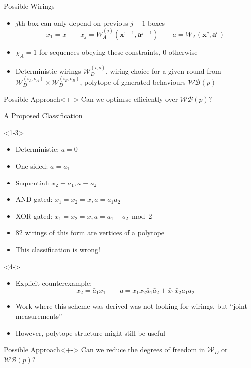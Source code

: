 \documentclass[xcolor=dvipsnames]{beamer}
\newcommand{\?}{\mathrel{?}} %
\newcommand{\cvec}[1]{\boldsymbol{\mathbf{#1}}}    %
\newcommand{\sW}{\mathcal{W}}
\newcommand{\sWB}{\mathcal{WB}}
\begin{document}
\begin{frame}{Possible Wirings}
  \begin{itemize}[<+->]
    \item \(j\)th box can only depend on previous \(j-1\) boxes
    \[ x_1 = x \qquad x_j = W^{(j)}_A(\cvec{x}^{j-1}, \cvec{a}^{j-1}) \qquad
      a = W_A(\cvec{x}^{c}, \cvec{a}^{c}) \]
    \item \(\chi_A = 1\) for sequences obeying these constraints, \(0\) otherwise
    \item Deterministic wirings \(\sW_D^{(i,o)}\), wiring choice for a given round from \(\sW_D^{(i_A,o_A)} \times \sW_D^{(i_B,o_B)}\), polytope of generated behaviours \(\sWB(p)\)
  \end{itemize}

  \begin{block}{Possible Approach}<+->
    Can we optimise efficiently over \(\sWB(p)\)?
  \end{block}
\end{frame}

\begin{frame}{A Proposed Classification}
  \begin{onlyenv}<1-3>
    \begin{itemize}
      \item Deterministic: \(a = 0\)
      \item One-sided: \(a = a_1\)
      \item Sequential: \(x_2 = a_1, a = a_2\)
      \item AND-gated: \(x_1 = x_2 = x, a = a_1a_2\)
      \item<+-> XOR-gated: \(x_1 = x_2 = x, a = a_1 + a_2 \bmod 2\)
      \item<+-> 82 wirings of this form are vertices of a polytope
      \item<+-> This classification is \alert{wrong}!
    \end{itemize}
  \end{onlyenv}
  \begin{onlyenv}<4->
    \begin{itemize}[<+->]
      \item Explicit counterexample:
        \[ x_2 = \bar{a}_1x_1 \qquad a = x_1x_2\bar{a}_1\bar{a}_2 + \bar{x}_1\bar{x}_2a_1a_2 \]
      \item Work where this scheme was derived was not looking for wirings, but ``joint measurements''
      \item However, polytope structure might still be useful
    \end{itemize}
  \end{onlyenv}
  \begin{block}{Possible Approach}<+->
    Can we reduce the degrees of freedom in \(\sW_D\) or \(\sWB(p)\)?
  \end{block}
\end{frame}
\end{document}
